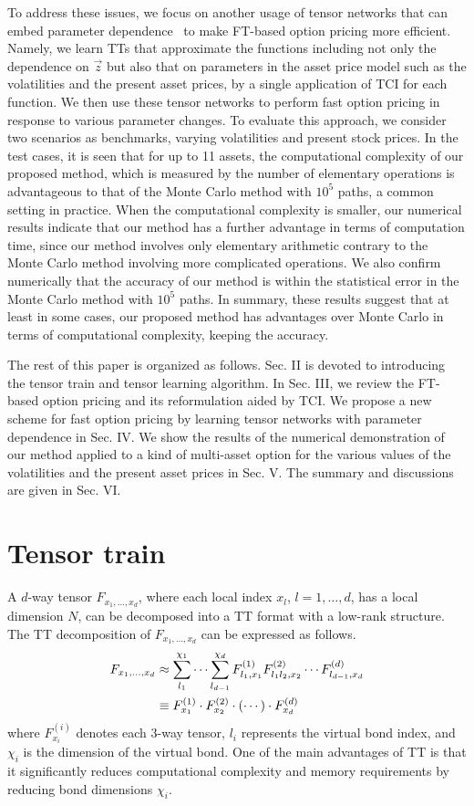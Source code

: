 To address these issues, we focus on another usage of tensor networks that can embed parameter dependence~\cite{990454, 10.1007/3-540-47969-4_30,10.1063/5.0045521} to make FT-based option pricing more efficient.
Namely, we learn TTs that approximate the functions including not only the dependence on  $\vec{z}$ but also that on parameters in the asset price model such as the volatilities and the present asset prices, by a single application of TCI for each function.
We then use these tensor networks to perform fast option pricing in response to various parameter changes.
To evaluate this approach, we consider two scenarios as benchmarks, varying volatilities and present stock prices.
In the test cases, it is seen that for up to 11 assets, the computational complexity of our proposed method, which is measured by the number of elementary operations is advantageous to that of the Monte Carlo method with $10^5$ paths, a common setting in practice.
When the computational complexity is smaller, our numerical results indicate that our method has a further advantage in terms of computation time, since our method involves only elementary arithmetic contrary to the Monte Carlo method involving more complicated operations.
We also confirm numerically that the accuracy of our method is within the statistical error in the Monte Carlo method with $10^5$ paths.
In summary, these results suggest that at least in some cases, our proposed method has advantages over Monte Carlo in terms of computational complexity, keeping the accuracy.

The rest of this paper is organized as follows.
Sec. II is devoted to introducing the tensor train and tensor learning algorithm. 
In Sec. III, we review the FT-based option pricing and its reformulation aided by TCI.
We propose a new scheme for fast option pricing by learning tensor networks with parameter dependence in Sec. IV.  We show the results of the numerical demonstration of our method applied to a kind of multi-asset option for the various values of the volatilities and the present asset prices in Sec. V.
The summary and discussions are given in Sec. VI.

\section{Tensor train}
A $d$-way tensor $F_{x_1, \dots, x_d}$, where each local index $x_l$, $l=1, \dots, d$, has a local dimension $N$, can be decomposed into a TT format with a low-rank structure. 
The TT decomposition of $F_{x_1, \ldots, x_d}$ can be expressed as follows. 
\begin{align}
    F_{x_1, \ldots, x_d} &\approx \sum_{l_1}^{\chi_1} \cdots \sum_{l_{d-1}}^{\chi_d} F_{l_1, x_1}^{(1)} F_{l_1 l_2, x_2}^{(2)} \cdots F_{l_{d-1}, x_d}^{(d)} \notag \\
    &\equiv 
    F_{x_1}^{(1)} \cdot F_{x_2}^{(2)} \cdot (\cdots) \cdot F_{x_d}^{(d)}
\end{align}
where $F_{x_i}^{(i)}$ denotes each 3-way tensor, $l_i$ represents the virtual bond index, and $\chi_i$ is the dimension of the virtual bond. 
One of the main advantages of TT is that it significantly reduces computational complexity and memory requirements by reducing bond dimensions $\chi_i$. 

